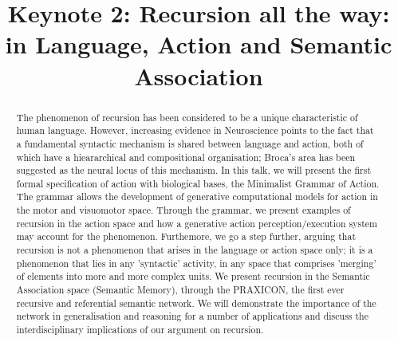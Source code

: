 \documentclass{article}
\title{Keynote 2: Recursion all the way: in Language, Action and Semantic Association}
\begin{document}
\maketitle
\thispagestyle{empty}
\begin{abstract}
The phenomenon of recursion has been considered to be a unique characteristic of human language. However, increasing evidence in Neuroscience points to the fact that a fundamental syntactic mechanism is shared between language and action, both of which have a hieararchical and compositional organisation; Broca's area has been suggested as the neural locus of this mechanism.  In this talk, we will present the first formal specification of action with biological bases, the Minimalist Grammar of Action. The grammar allows the development of  generative computational models for action in the motor and visuomotor space. Through the grammar, we present examples of recursion in the action space and how a generative action perception/execution system may account for the phenomenon. Furthemore, we go a step further, arguing that recursion is not a phenomenon that arises in the language or action space only; it is a phenomenon that lies in any 'syntactic' activity, in any space that comprises 'merging' of elements into more and more complex units. We present recursion in the Semantic Association space (Semantic Memory), through the PRAXICON, the first ever recursive and referential semantic network. We will demonstrate the importance of the network in generalisation and reasoning for a number of applications and discuss the interdisciplinary implications of our argument on recursion. 
\end{abstract}
\vfill{}
\end{document}
